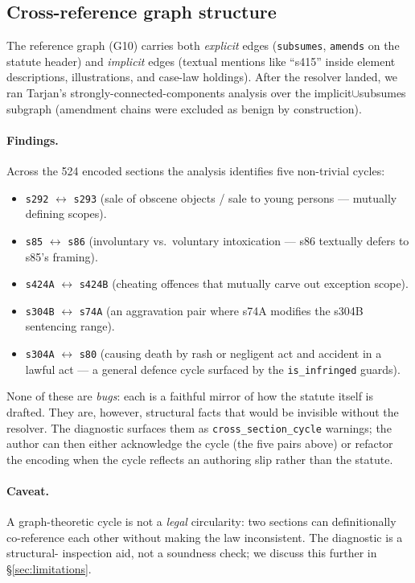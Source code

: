 \subsection{Cross-reference graph structure}
\label{subsec:scc_eval}

The reference graph (G10) carries both \emph{explicit} edges
(\texttt{subsumes}, \texttt{amends} on the statute header) and
\emph{implicit} edges (textual mentions like ``s415'' inside element
descriptions, illustrations, and case-law holdings). After the resolver
landed, we ran Tarjan's strongly-connected-components analysis over the
implicit$\cup$subsumes subgraph (amendment chains were excluded as
benign by construction).

\paragraph{Findings.} Across the 524 encoded sections the analysis
identifies five non-trivial cycles:
\begin{itemize}
\item \texttt{s292} $\leftrightarrow$ \texttt{s293} (sale of obscene
      objects / sale to young persons --- mutually defining scopes).
\item \texttt{s85} $\leftrightarrow$ \texttt{s86} (involuntary vs.\
      voluntary intoxication --- s86 textually defers to s85's framing).
\item \texttt{s424A} $\leftrightarrow$ \texttt{s424B} (cheating offences
      that mutually carve out exception scope).
\item \texttt{s304B} $\leftrightarrow$ \texttt{s74A} (an aggravation
      pair where s74A modifies the s304B sentencing range).
\item \texttt{s304A} $\leftrightarrow$ \texttt{s80} (causing death by
      rash or negligent act and accident in a lawful act --- a general
      defence cycle surfaced by the \texttt{is\_infringed} guards).
\end{itemize}
None of these are \emph{bugs}: each is a faithful mirror of how the
statute itself is drafted. They are, however, structural facts that
would be invisible without the resolver. The diagnostic surfaces them as
\texttt{cross\_section\_cycle} warnings; the author can then either
acknowledge the cycle (the five pairs above) or refactor the encoding
when the cycle reflects an authoring slip rather than the statute.

\paragraph{Caveat.} A graph-theoretic cycle is not a \emph{legal}
circularity: two sections can definitionally co-reference each other
without making the law inconsistent. The diagnostic is a structural-
inspection aid, not a soundness check; we discuss this further in
\S\ref{sec:limitations}.

